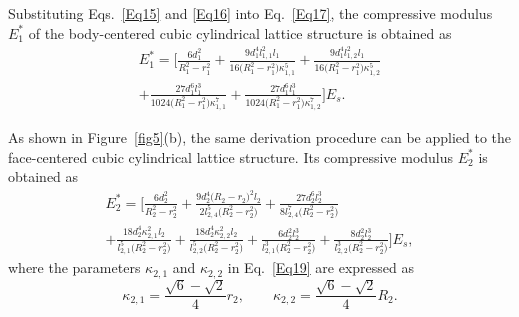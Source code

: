 \documentclass[12pt,a4paper]{article}
\begin{document}
	Substituting Eqs.~\eqref{Eq15} and \eqref{Eq16} into Eq.~\eqref{Eq17}, the compressive modulus $E_1^*$ of the body-centered cubic cylindrical lattice structure is obtained as
	\begin{multline}
		E_1^*
		= \Bigg[
		\frac{6d_1^2}{R_1^2-r_1^2}
		+\frac{9d_1^4l_{1,1}^2l_1}
		{16\bigl(R_1^2-r_1^2\bigr)\kappa_{1,1}^5}
		+\frac{9d_1^4l_{1,2}^2l_1}
		{16\bigl(R_1^2-r_1^2\bigr)\kappa_{1,2}^5} \\
		+\frac{27d_1^6l_1^3}
		{1024\bigl(R_1^2-r_1^2\bigr)\kappa_{1,1}^7}
		+\frac{27d_1^6l_1^3}
		{1024\bigl(R_1^2-r_1^2\bigr)\kappa_{1,2}^7}
		\Bigg]E_s .
		\label{Eq18}
	\end{multline}
	
	As shown in Figure~\ref{fig5}(b), the same derivation procedure can be applied to the face-centered cubic cylindrical lattice structure. Its compressive modulus $E_2^*$ is obtained as
	\begin{multline}
		E_2^*
		= \Bigg[
		\frac{6d_2^2}{R_2^2-r_2^2}
		+\frac{9d_2^4\bigl(R_2-r_2\bigr)^2l_2}
		{2l_{2,4}^5\bigl(R_2^2-r_2^2\bigr)}
		+\frac{27d_2^6l_2^3}
		{8l_{2,4}^7\bigl(R_2^2-r_2^2\bigr)} \\
		+\frac{18d_2^4\kappa_{2,1}^2l_2}
		{l_{2,1}^5\bigl(R_2^2-r_2^2\bigr)}
		+\frac{18d_2^4\kappa_{2,2}^2l_2}
		{l_{2,2}^5\bigl(R_2^2-r_2^2\bigr)}
		+\frac{6d_2^2l_2^3}
		{l_{2,1}^3\bigl(R_2^2-r_2^2\bigr)}
		+\frac{8d_2^2l_2^3}
		{l_{2,2}^3\bigl(R_2^2-r_2^2\bigr)}
		\Bigg]E_s ,
		\label{Eq19}
	\end{multline}
	where the parameters $\kappa_{2,1}$ and $\kappa_{2,2}$ in Eq.~\eqref{Eq19} are expressed as
	\[
	\kappa_{2,1}
	=
	\frac{\sqrt{6}-\sqrt{2}}{4}r_2,
	\qquad
	\kappa_{2,2}
	=
	\frac{\sqrt{6}-\sqrt{2}}{4}R_2 .
	\]
	
\end{document}
